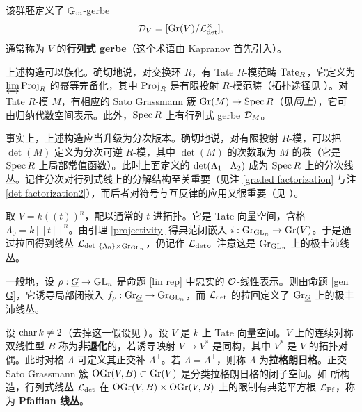 \begin{rmk}
该群胚定义了 ${\mathbb G}_m$-gerbe
\[{\mathcal D}_V=[{\operatorname{Gr}}(V)/ {\mathcal L}_{\det}^\times],\]
通常称为 $V$ 的\textbf{行列式 gerbe}（这个术语由 Kapranov 首先引入）。
\end{rmk}

\begin{rmk}
上述构造可以族化。确切地说，对交换环 $R$，有 Tate $R$-模范畴 $\operatorname{Tate}_R$，它定义为 $\underleftrightarrow{\lim}\operatorname{Proj}_R$ 的幂等完备化，其中 $\operatorname{Proj}_R$ 是有限投射 $R$-模范畴（拓扑途径见 \cite{Dr}）。对 Tate $R$-模 $M$，有相应的 Sato Grassmann 簇 ${\operatorname{Gr}}(M)\to \operatorname{Spec} R$（见\emph{同上}），它可由归纳代数空间表示。此外，$\operatorname{Spec} R$ 上有行列式 gerbe ${\mathcal D}_M$。
\end{rmk}

\begin{rmk}\label{graded line}
事实上，上述构造应当升级为分次版本。确切地说，对有限投射 $R$-模，可以把 $\det(M)$ 定义为分次可逆 $R$-模，其中 $\det(M)$ 的次数取为 $M$ 的秩（它是 $\operatorname{Spec} R$ 上局部常值函数）。此时上面定义的 $\det({\Lambda}_1\mid{\Lambda}_2)$ 成为 $\operatorname{Spec} R$ 上的分次线丛。记住分次对行列式线上的分解结构至关重要（见注 \ref{graded factorization} 与注 \ref{det factorization2}），而后者对符号与互反律的应用又很重要（见 \cite{BBE, OZ1, OZ2}）。
\end{rmk}

取 $V=k((t))^n$，配以通常的 $t$-进拓扑。它是 Tate 向量空间，含格 $\Lambda_0=k[[t]]^n$。由引理 \ref{projectivity} 得典范闭嵌入 $i:{\operatorname{Gr}}_{{\operatorname{GL}}_{n}}\to{\operatorname{Gr}}(V)$。于是通过拉回得到线丛 ${\mathcal L}_{\det}|_{\{{\Lambda}_0\}\times{\operatorname{Gr}}_{{\operatorname{GL}}_n}}$，仍记作 ${\mathcal L}_{\det}$。注意这是 ${\operatorname{Gr}}_{{\operatorname{GL}}_n}$ 上的极丰沛线丛。

一般地，设 $\rho: \underline G\to {\operatorname{GL}}_n$ 是命题 \ref{lin rep} 中忠实的 ${\mathcal O}$-线性表示。则由命题 \ref{gen G}，它诱导局部闭嵌入 $f_\rho: {\operatorname{Gr}}_{\underline G}\to {\operatorname{Gr}}_{{\operatorname{GL}}_n}$，而 ${\mathcal L}_{\det}$ 的拉回定义了 ${\operatorname{Gr}}_{\underline G}$ 上的极丰沛线丛。

\begin{rmk}\label{Pfaffians}
设 $\operatorname{char} k\neq 2$（去掉这一假设见 \cite[\S\ 4.2.16]{BD}）。设 $V$ 是 $k$ 上 Tate 向量空间。$V$ 上的连续对称双线性型 $B$ 称为\textbf{非退化}的，若诱导映射 $V\to V^*$ 是同构，其中 $V^*$ 是 $V$ 的拓扑对偶。此时对格 $\Lambda$ 可定义其正交补 $\Lambda^\perp$。若 $\Lambda=\Lambda^\perp$，则称 $\Lambda$ 为\textbf{拉格朗日格}。正交 Sato Grassmann 簇 $\operatorname{OGr}(V,B)\subset {\operatorname{Gr}}(V)$ 是分类拉格朗日格的闭子空间。如 \cite[\S\ 4]{BD} 所构造，行列式线丛 ${\mathcal L}_{\det}$ 在 $\operatorname{OGr}(V,B)\times \operatorname{OGr}(V,B)$ 上的限制有典范平方根 ${\mathcal L}_{\operatorname{Pf}}$，称为 \textbf{Pfaffian 线丛}。
\end{rmk}
